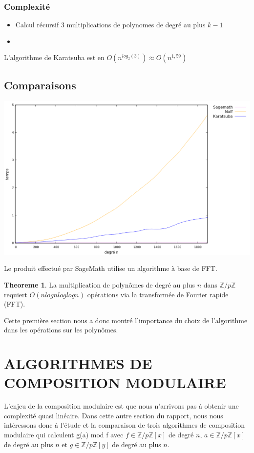 \documentclass[a4paper]{article}
\begin{document}
\subsubsection*{Complexité}
\begin{itemize}
    \item Calcul récursif 3 multiplications de polynomes de degré au plus $k-1$
    \item 
\end{itemize}
L'algorithme de Karatsuba est en $O(n^{log_2(3)}) \approx O(n^{1,59})$

\subsection{Comparaisons}

\includegraphics[scale=0.5, center]{multi.png}

Le produit effectué par SageMath utilise un algorithme à base de FFT.


\theoremstyle{definition}
\newtheorem*{thm}{Theoreme}
\begin{thm}
La multiplication de polynômes de degré au plus $n$ dans $\mathbb{Z}/p\mathbb{Z}$ requiert $O(nlognloglogn)$ opérations via la transformée de Fourier rapide (FFT).
\cite{aecf-2017-livre}
\end{thm}

Cette première section nous a donc montré l'importance du choix de l'algorithme dans les opérations sur les polynômes.


\section{ALGORITHMES DE COMPOSITION MODULAIRE}

L'enjeu de la composition modulaire est que nous n'arrivons pas à obtenir une complexité quasi linéaire.
Dans cette autre section du rapport, nous nous intéressons donc à l'étude et la comparaison de trois algorithmes de composition modulaire qui calculent g(a) mod f avec 
$f \in \mathbb{Z}/p\mathbb{Z}[x]$ de degré $n$, $a \in \mathbb{Z}/p\mathbb{Z}[x]$ de degré au plus $n$ et $g \in \mathbb{Z}/p\mathbb{Z}[y]$ de degré au plus $n$.
\end{document}
